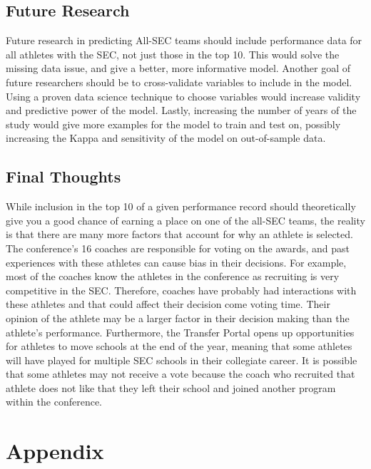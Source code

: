 \documentclass{article}
\begin{document}
\subsection{Future Research}
Future research in predicting All-SEC teams should include performance data for all athletes with the SEC, not just those in the top 10. This would solve the missing data issue, and give a better, more informative model. Another goal of future researchers should be to cross-validate variables to include in the model. Using a proven data science technique to choose variables would increase validity and predictive power of the model. Lastly, increasing the number of years of the study would give more examples for the model to train and test on, possibly increasing the Kappa and sensitivity of  the model on out-of-sample data.

\subsection{Final Thoughts}
While inclusion in the top 10 of a given performance record should theoretically give you a good chance of earning a place on one of the all-SEC teams, the reality is that there are many more factors that account for why an athlete is selected. The conference’s 16 coaches are responsible for voting on the awards, and past experiences with these athletes can cause bias in their decisions. For example, most of the coaches know the athletes in the conference as recruiting is very competitive in the SEC. Therefore, coaches have probably had interactions with these athletes and that could affect their decision come voting time. Their opinion of the athlete may be a larger factor in their decision making than the athlete’s performance. Furthermore, the Transfer Portal opens up opportunities for athletes to move schools at the end of the year, meaning that some athletes will have played for multiple SEC schools in their collegiate career. It is possible that some athletes may not receive a vote because the coach who recruited that athlete does not like that they left their school and joined another program within the conference.

\newpage




\appendix

\section{Appendix}
\end{document}
